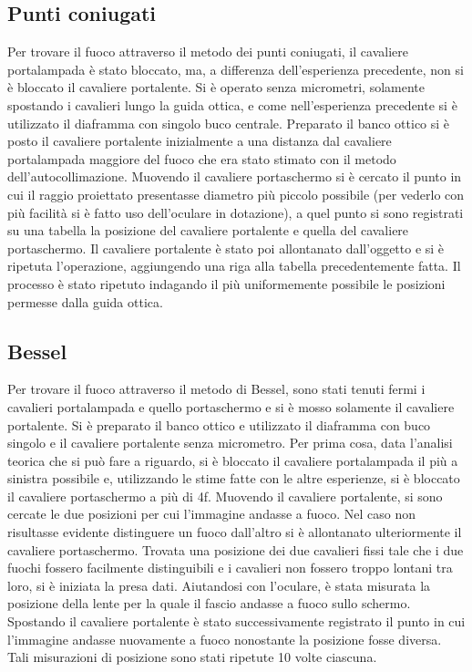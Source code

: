 \subsection{Punti coniugati} 
Per trovare il fuoco attraverso il metodo dei punti coniugati, il 
cavaliere portalampada \`e stato bloccato, ma, a differenza dell'esperienza 
precedente, non si è bloccato il cavaliere portalente. Si è 
operato senza micrometri, solamente spostando i cavalieri lungo la 
guida ottica, e come nell'esperienza precedente si è utilizzato il 
diaframma con singolo buco centrale. Preparato il banco ottico si è 
posto il cavaliere portalente inizialmente a una distanza dal 
cavaliere portalampada maggiore del fuoco che era stato stimato con 
il metodo dell'autocollimazione. Muovendo il cavaliere portaschermo 
si è cercato il punto in cui il raggio proiettato presentasse 
diametro più piccolo possibile (per vederlo con più facilità si è 
fatto uso dell'oculare in dotazione), a quel punto si sono 
registrati su una tabella la posizione del cavaliere portalente e 
quella del cavaliere portaschermo. Il cavaliere portalente è stato 
poi allontanato dall'oggetto e si è ripetuta l'operazione, aggiungendo una 
riga alla tabella precedentemente fatta. Il processo è stato 
ripetuto indagando il più uniformemente possibile le posizioni 
permesse dalla guida ottica.

\subsection{Bessel}
Per trovare il fuoco attraverso il metodo di Bessel, sono stati 
tenuti fermi i cavalieri portalampada e quello portaschermo e si è 
mosso solamente il cavaliere portalente. Si è preparato il banco 
ottico e utilizzato il diaframma con buco singolo e il cavaliere 
portalente senza micrometro. Per prima cosa, data l'analisi teorica 
che si può fare a riguardo, si è bloccato il cavaliere portalampada 
il più a sinistra possibile e, 
utilizzando le stime fatte con le altre esperienze, si è bloccato il 
cavaliere portaschermo a più di 4f. Muovendo il cavaliere 
portalente, si sono cercate le due posizioni per cui l'immagine 
andasse a fuoco. Nel caso non risultasse evidente distinguere un 
fuoco dall'altro si è allontanato ulteriormente il cavaliere 
portaschermo. Trovata una posizione dei due cavalieri fissi tale che 
i due fuochi fossero facilmente distinguibili e i cavalieri non 
fossero troppo lontani tra loro, si è iniziata la presa dati. 
Aiutandosi con l'oculare, è stata misurata la posizione della lente 
per la quale il fascio andasse a fuoco sullo schermo. Spostando il 
cavaliere portalente è stato successivamente registrato il punto 
in cui l'immagine andasse nuovamente a fuoco nonostante la posizione 
fosse diversa. Tali misurazioni di posizione sono stati ripetute 10 
volte ciascuna.

